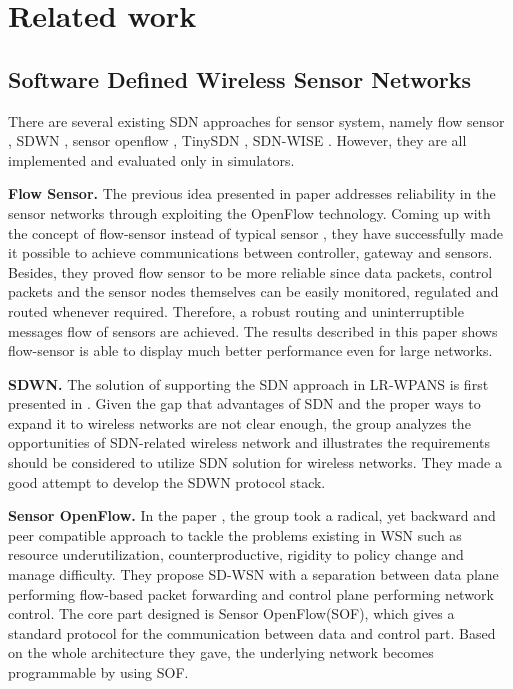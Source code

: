 \section{Related work}

\subsection{Software Defined Wireless Sensor Networks}


There are several existing SDN approaches for sensor system, 
namely flow sensor \cite{mahmud2011exploitation}, SDWN \cite{costanzo2012software},
sensor openflow \cite{luo2012sensor}, TinySDN \cite{de2015tinysdn}, SDN-WISE \cite{galluccio2015sdn}.
However, they are all implemented and evaluated only in simulators. 

\textbf{Flow Sensor.}
The previous idea presented in paper \cite{mahmud2011exploitation} addresses 
reliability in the sensor networks through exploiting the OpenFlow technology\cite{Mckeown2008OpenFlow}. 
Coming up with the concept of flow-sensor instead of typical sensor \cite{Liu2015Thermoresistive}, 
they have successfully made it possible to achieve communications between controller, 
gateway and sensors. Besides, they proved flow sensor to be more 
reliable since data packets, control packets and the sensor nodes 
themselves can be easily monitored, regulated and routed whenever 
required. Therefore, a robust routing and uninterruptible messages 
flow of sensors are achieved. The results described in this paper 
shows flow-sensor is able to display much better performance even for large networks.

\textbf{SDWN.}
The solution of supporting the SDN approach in LR-WPANS is first presented in \cite{costanzo2012software}. 
Given the gap that advantages of SDN and the proper ways to expand it to wireless networks are not clear enough, 
the group analyzes the opportunities of SDN-related wireless network and illustrates 
the requirements should be considered to utilize SDN solution for wireless networks. 
They made a good attempt to develop the SDWN protocol stack.

\textbf{Sensor OpenFlow.}
In the paper \cite{luo2012sensor}, the group took a radical, yet backward 
and peer compatible approach to tackle the problems existing in WSN 
such as resource underutilization, counterproductive, rigidity to policy 
change and manage difficulty. They propose SD-WSN with a separation between 
data plane performing flow-based packet forwarding and control plane performing network control. 
The core part designed is Sensor OpenFlow(SOF), which gives a standard protocol for the communication 
between data and control part. Based on the whole architecture they gave, 
the underlying network becomes programmable by using SOF.

